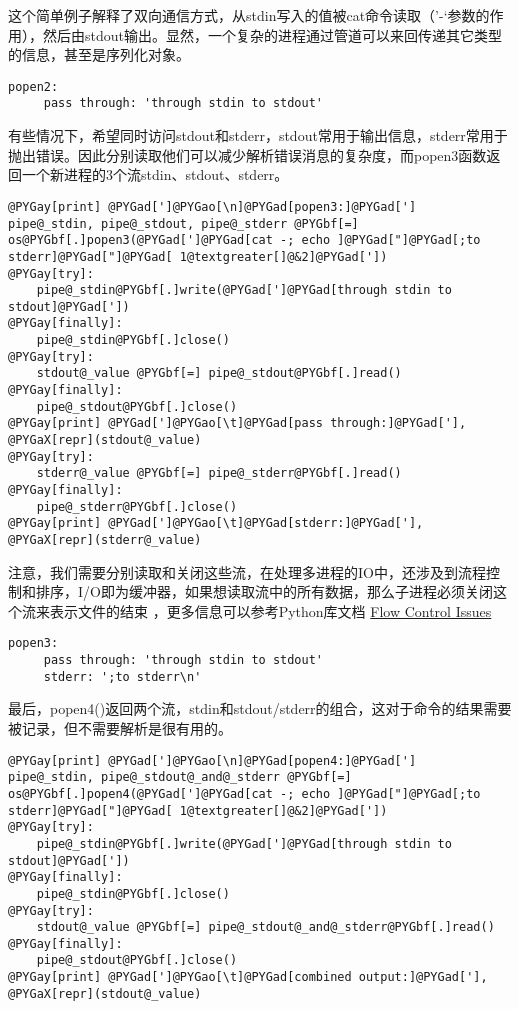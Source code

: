 \documentclass[letterpaper,10pt,english]{manual}
\begin{document}
这个简单例子解释了双向通信方式，从stdin写入的值被cat命令读取（'-`参数的作用），然后由stdout输出。显然，一个复杂的进程通过管道可以来回传递其它类型的信息，甚至是序列化对象。

\begin{Verbatim}[commandchars=@\[\]]
popen2:
     pass through: 'through stdin to stdout'
\end{Verbatim}

有些情况下，希望同时访问stdout和stderr，stdout常用于输出信息，stderr常用于抛出错误。因此分别读取他们可以减少解析错误消息的复杂度，而popen3函数返回一个新进程的3个流stdin、stdout、stderr。

\begin{Verbatim}[commandchars=@\[\]]
@PYGay[print] @PYGad[']@PYGao[\n]@PYGad[popen3:]@PYGad[']
pipe@_stdin, pipe@_stdout, pipe@_stderr @PYGbf[=] os@PYGbf[.]popen3(@PYGad[']@PYGad[cat -; echo ]@PYGad["]@PYGad[;to stderr]@PYGad["]@PYGad[ 1@textgreater[]@&2]@PYGad['])
@PYGay[try]:
    pipe@_stdin@PYGbf[.]write(@PYGad[']@PYGad[through stdin to stdout]@PYGad['])
@PYGay[finally]:
    pipe@_stdin@PYGbf[.]close()
@PYGay[try]:
    stdout@_value @PYGbf[=] pipe@_stdout@PYGbf[.]read()
@PYGay[finally]:
    pipe@_stdout@PYGbf[.]close()
@PYGay[print] @PYGad[']@PYGao[\t]@PYGad[pass through:]@PYGad['], @PYGaX[repr](stdout@_value)
@PYGay[try]:
    stderr@_value @PYGbf[=] pipe@_stderr@PYGbf[.]read()
@PYGay[finally]:
    pipe@_stderr@PYGbf[.]close()
@PYGay[print] @PYGad[']@PYGao[\t]@PYGad[stderr:]@PYGad['], @PYGaX[repr](stderr@_value)
\end{Verbatim}

注意，我们需要分别读取和关闭这些流，在处理多进程的IO中，还涉及到流程控制和排序，I/O即为缓冲器，如果想读取流中的所有数据，那么子进程必须关闭这个流来表示文件的结束 ，更多信息可以参考Python库文档 \href{http://docs.python.org/lib/popen2-flow-control.html}{Flow Control Issues}

\begin{Verbatim}[commandchars=@\[\]]
popen3:
     pass through: 'through stdin to stdout'
     stderr: ';to stderr\n'
\end{Verbatim}

最后，popen4()返回两个流，stdin和stdout/stderr的组合，这对于命令的结果需要被记录，但不需要解析是很有用的。

\begin{Verbatim}[commandchars=@\[\]]
@PYGay[print] @PYGad[']@PYGao[\n]@PYGad[popen4:]@PYGad[']
pipe@_stdin, pipe@_stdout@_and@_stderr @PYGbf[=] os@PYGbf[.]popen4(@PYGad[']@PYGad[cat -; echo ]@PYGad["]@PYGad[;to stderr]@PYGad["]@PYGad[ 1@textgreater[]@&2]@PYGad['])
@PYGay[try]:
    pipe@_stdin@PYGbf[.]write(@PYGad[']@PYGad[through stdin to stdout]@PYGad['])
@PYGay[finally]:
    pipe@_stdin@PYGbf[.]close()
@PYGay[try]:
    stdout@_value @PYGbf[=] pipe@_stdout@_and@_stderr@PYGbf[.]read()
@PYGay[finally]:
    pipe@_stdout@PYGbf[.]close()
@PYGay[print] @PYGad[']@PYGao[\t]@PYGad[combined output:]@PYGad['], @PYGaX[repr](stdout@_value)
\end{Verbatim}
\end{document}

